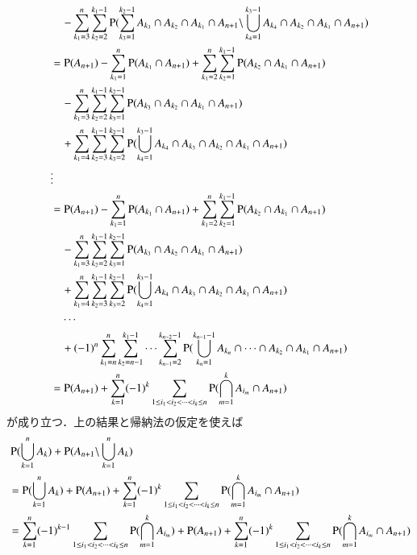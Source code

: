 \begin{description}
\begin{description}
\begin{align}
					&\quad- \sum_{k_1=3}^{n} \sum_{k_2=2}^{k_1 - 1} \operatorname{P} (\sum_{k_3=1}^{k_2 - 1} A_{k_3} \cap A_{k_2} \cap A_{k_1} \cap A_{n+1} \backslash \bigcup_{k_4 = 1}^{k_3 - 1} A_{k_4} \cap A_{k_2} \cap A_{k_1} \cap A_{n+1}) \\
				&= \operatorname{P} (A_{n+1}) - \sum_{k_1=1}^{n} \operatorname{P} (A_{k_1} \cap A_{n+1}) + \sum_{k_1=2}^{n} \sum_{k_2=1}^{k_1 - 1} \operatorname{P} (A_{k_2} \cap A_{k_1} \cap A_{n+1}) \\
					&\quad- \sum_{k_1=3}^{n} \sum_{k_2=2}^{k_1 - 1} \sum_{k_3=1}^{k_2 - 1} \operatorname{P} ( A_{k_3} \cap A_{k_2} \cap A_{k_1} \cap A_{n+1}) \\
					&\quad+ \sum_{k_1=4}^{n} \sum_{k_2=3}^{k_1 - 1} \sum_{k_3=2}^{k_2 - 1} \operatorname{P} (\bigcup_{k_4 = 1}^{k_3 - 1} A_{k_4} \cap A_{k_3} \cap A_{k_2} \cap A_{k_1} \cap A_{n+1}) \\
				& \vdots \\
				&= \operatorname{P} (A_{n+1}) - \sum_{k_1=1}^{n} \operatorname{P} (A_{k_1} \cap A_{n+1}) + \sum_{k_1=2}^{n} \sum_{k_2=1}^{k_1 - 1} \operatorname{P} (A_{k_2} \cap A_{k_1} \cap A_{n+1}) \\
					&\quad- \sum_{k_1=3}^{n} \sum_{k_2=2}^{k_1 - 1} \sum_{k_3=1}^{k_2 - 1} \operatorname{P} ( A_{k_3} \cap A_{k_2} \cap A_{k_1} \cap A_{n+1}) \\
					&\quad+ \sum_{k_1=4}^{n} \sum_{k_2=3}^{k_1 - 1} \sum_{k_3=2}^{k_2 - 1} \operatorname{P} (\bigcup_{k_4 = 1}^{k_3 - 1} A_{k_4} \cap A_{k_3} \cap A_{k_2} \cap A_{k_1} \cap A_{n+1}) \\
					&\quad\cdots \\
					&\quad +(-1)^n  \sum_{k_1=n}^{n} \sum_{k_2=n-1}^{k_1 - 1} \cdots \sum_{k_{n-1} = 2}^{k_{n-2}-1} \operatorname{P} (\bigcup_{k_n = 1}^{k_{n-1} - 1} A_{k_{n}} \cap \cdots \cap A_{k_2} \cap A_{k_1} \cap A_{n+1}) \\
				&= \operatorname{P} (A_{n+1}) + \sum_{k=1}^{n}(-1)^k \sum_{1 \leq i_1 < i_2 < \cdots < i_k \leq n} \operatorname{P} (\bigcap_{m=1}^{k}A_{i_m} \cap A_{n+1})
			\end{align}
			が成り立つ．上の結果と帰納法の仮定を使えば
			\begin{align}
				&\prob{\bigcup_{k=1}^{n} A_k} + \prob{A_{n+1} \backslash \bigcup_{k=1}^{n}A_k} \\
				&= \prob{\bigcup_{k=1}^{n} A_k} + \prob{A_{n+1}} + \sum_{k=1}^{n}(-1)^k \sum_{1 \leq i_1 < i_2 < \cdots < i_k \leq n} \prob{\bigcap_{m=1}^{k}A_{i_m} \cap A_{n+1}} \\
				&= \sum_{k=1}^{n}(-1)^{k-1} \sum_{1 \leq i_1 < i_2 < \cdots < i_k \leq n} \prob{\bigcap_{m=1}^{k}A_{i_m}} + \prob{A_{n+1}} + \sum_{k=1}^{n}(-1)^k \sum_{1 \leq i_1 < i_2 < \cdots < i_k \leq n} \prob{\bigcap_{m=1}^{k}A_{i_m} \cap A_{n+1}} \\

\end{align}
\end{description}
\end{description}
